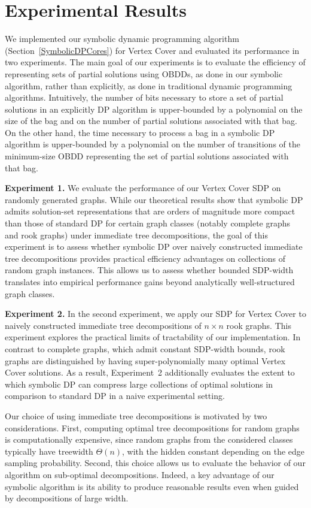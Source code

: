 
\section{Experimental Results}\label{sec:Experiments}

We implemented our symbolic dynamic programming algorithm
(Section~\ref{SymbolicDPCores}) for {\sc Vertex Cover} and evaluated its
performance in two experiments. The main goal of our experiments is to evaluate the efficiency of representing sets of partial solutions using OBDDs, as done in our symbolic algorithm, rather than explicitly, as done in traditional dynamic programming algorithms. Intuitively, the number of bits necessary to store a set of partial solutions in an explicitly DP algorithm is upper-bounded by a polynomial on the size of the bag and on the number of partial solutions associated with that bag. On the other hand, the time necessary to process a bag in a symbolic DP algorithm is upper-bounded by a polynomial on the number of transitions of the minimum-size OBDD representing the set of partial solutions associated with that bag.

\textbf{Experiment 1.}
We evaluate the performance of our {\sc Vertex Cover} SDP on randomly generated
graphs. While our theoretical results show that symbolic DP admits solution-set
representations that are orders of magnitude more compact than those of standard
DP for certain graph classes (notably complete graphs and rook graphs) under
immediate tree decompositions, the goal of this experiment is to assess whether
symbolic DP over naively constructed immediate tree decompositions provides
practical efficiency advantages on collections of random graph instances. This allows us to assess whether bounded SDP-width translates into empirical
performance gains beyond analytically well-structured graph classes.


\textbf{Experiment 2.}
In the second experiment, we apply our SDP for {\sc Vertex Cover} to naively
constructed immediate tree decompositions of $n \times n$ rook graphs. This
experiment explores the practical limits of tractability of our implementation.
In contrast to complete graphs, which admit constant SDP-width bounds,
rook graphs are distinguished by having super-polynomially many optimal
{\sc Vertex Cover} solutions. As a result, Experiment~2 additionally evaluates
the extent to which symbolic DP can compress large collections of optimal
solutions in comparison to standard DP in a naive experimental setting.

Our choice of using immediate tree decompositions is motivated by two
considerations. First, computing optimal tree decompositions for random graphs
is computationally expensive, since random graphs from the considered classes
typically have treewidth $\Theta(n)$, with the hidden constant depending on the
edge sampling probability. Second, this choice allows us to evaluate the
behavior of our algorithm on sub-optimal decompositions. Indeed, a key advantage
of our symbolic algorithm is its ability to produce reasonable results even when
guided by decompositions of large width.

